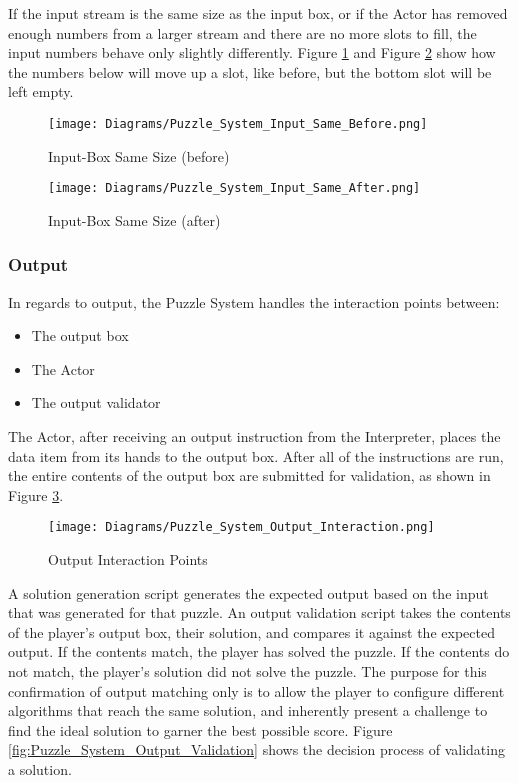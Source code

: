 If the input stream is the same size as the input box, or if the Actor has removed
enough numbers from a larger stream and there are no more slots to fill, the input numbers
behave only slightly differently. Figure \ref{fig:Puzzle_System_Input_Same_Before}
and Figure \ref{fig:Puzzle_System_Input_Same_After} show how the numbers below will move up a slot, like before,
but the bottom slot will be left empty.\\

\begin{figure}[!htb]
  \caption{Input-Box Same Size (before)}
  \label{fig:Puzzle_System_Input_Same_Before}
  \centering
  \texttt{[image: Diagrams/Puzzle\_System\_Input\_Same\_Before.png]}
\end{figure}

\begin{figure}[!htb]
  \caption{Input-Box Same Size (after)}
  \label{fig:Puzzle_System_Input_Same_After}
  \centering
  \texttt{[image: Diagrams/Puzzle\_System\_Input\_Same\_After.png]}
\end{figure}
\vfill
\clearpage

\subsubsection{Output}
In regards to output, the Puzzle System handles the interaction points between:
\begin{itemize}
  \item The output box
  \item The Actor
  \item The output validator
\end{itemize}
The Actor, after receiving an output instruction from the Interpreter, places the
data item from its hands to the output box. After all of the instructions are run, the
entire contents of the output box are submitted for validation, as shown in Figure
\ref{fig:Puzzle_System_Output_Interaction}.\\


\begin{figure}[!hb]
  \caption{Output Interaction Points}
  \label{fig:Puzzle_System_Output_Interaction}
  \centering
  \texttt{[image: Diagrams/Puzzle\_System\_Output\_Interaction.png]}
\end{figure}

A solution generation script generates the expected output based on the input that
was generated for that puzzle. An output validation script takes the contents of
the player's output box, their solution, and compares it against the expected output.
If the contents match, the player has solved the puzzle. If the contents do not match,
the player's solution did not solve the puzzle. The purpose for this confirmation of output
matching only is to allow the player to configure different algorithms that reach the same
solution, and inherently present a challenge to find the ideal solution to garner the best
possible score. Figure \ref{fig:Puzzle_System_Output_Validation} shows the decision process
of validating a solution.

